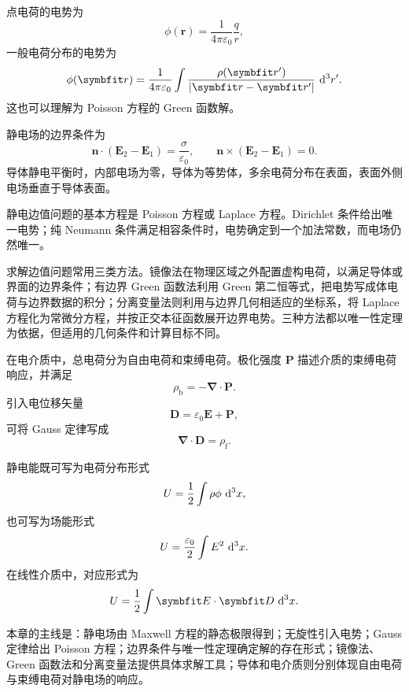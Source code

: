 点电荷的电势为
\[
\phi(\bm{r})
=
\frac{1}{4\pi\varepsilon_{0}}
\frac{q}{r},
\]
一般电荷分布的电势为
\[
\phi(\bm{r})
=
\frac{1}{4\pi\varepsilon_{0}}
\int
\frac{\rho(\bm{r}')}{|\bm{r}-\bm{r}'|}
\,\dif^{3}r'.
\]
这也可以理解为 Poisson 方程的 Green 函数解。

静电场的边界条件为
\[
\bm{n}\cdot(\bm{E}_{2}-\bm{E}_{1})
=
\frac{\sigma}{\varepsilon_{0}},
\qquad
\bm{n}\times(\bm{E}_{2}-\bm{E}_{1})=0.
\]
导体静电平衡时，内部电场为零，导体为等势体，多余电荷分布在表面，表面外侧电场垂直于导体表面。

静电边值问题的基本方程是 Poisson 方程或 Laplace 方程。Dirichlet 条件给出唯一电势；纯 Neumann 条件满足相容条件时，电势确定到一个加法常数，而电场仍然唯一。

求解边值问题常用三类方法。镜像法在物理区域之外配置虚构电荷，以满足导体或界面的边界条件；有边界 Green 函数法利用 Green 第二恒等式，把电势写成体电荷与边界数据的积分；分离变量法则利用与边界几何相适应的坐标系，将 Laplace 方程化为常微分方程，并按正交本征函数展开边界电势。三种方法都以唯一性定理为依据，但适用的几何条件和计算目标不同。

在电介质中，总电荷分为自由电荷和束缚电荷。极化强度 $\bm{P}$ 描述介质的束缚电荷响应，并满足
\[
\rho_{\mathrm{b}}
=
-\bm{\nabla}\cdot\bm{P}.
\]
引入电位移矢量
\[
\bm{D}
=
\varepsilon_{0}\bm{E}
+
\bm{P},
\]
可将 Gauss 定律写成
\[
\bm{\nabla}\cdot\bm{D}
=
\rho_{\mathrm{f}}.
\]

静电能既可写为电荷分布形式
\[
U
=
\frac{1}{2}
\int
\rho\phi\,\mathop{}\!\mathrm{d}^{3}x,
\]
也可写为场能形式
\[
U
=
\frac{\varepsilon_{0}}{2}
\int
E^{2}\,\mathop{}\!\mathrm{d}^{3}x.
\]
在线性介质中，对应形式为
\[
U
=
\frac{1}{2}
\int
\bm{E}\cdot\bm{D}\,\dif^{3}x.
\]

本章的主线是：静电场由 Maxwell 方程的静态极限得到；无旋性引入电势；Gauss 定律给出 Poisson 方程；边界条件与唯一性定理确定解的存在形式；镜像法、Green 函数法和分离变量法提供具体求解工具；导体和电介质则分别体现自由电荷与束缚电荷对静电场的响应。
